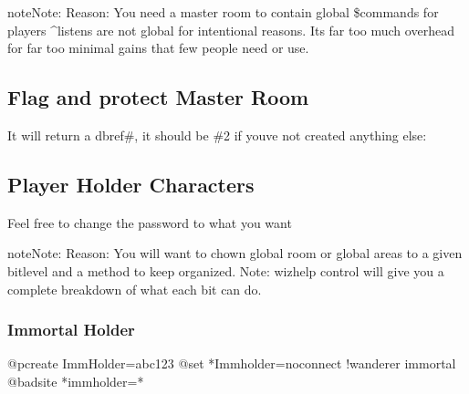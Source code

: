 \documentclass[letterpaper,10pt,english]{sphinxmanual}
\begin{document}
\begin{sphinxVerbatim}[commandchars=\\\{\}]
  
\end{sphinxVerbatim}

\begin{sphinxadmonition}{note}{Note:}
\sphinxAtStartPar
Reason: You need a master room to contain global \$commands for players
\textasciicircum{}listens are not global for intentional reasons.  It\textquotesingle{}s far too much overhead for far too minimal gains that few people need or use.
\end{sphinxadmonition}


\subsection{Flag and protect Master Room}
\label{\detokenize{gettingstarted:flag-and-protect-master-room}}
\sphinxAtStartPar
It will return a dbref\#, it should be \#2 if you\textquotesingle{}ve not created anything else:

\begin{sphinxVerbatim}[commandchars=\\\{\}]
 
\end{sphinxVerbatim}


\subsection{Player Holder Characters}
\label{\detokenize{gettingstarted:player-holder-characters}}
\sphinxAtStartPar
Feel free to change the password to what you want

\begin{sphinxadmonition}{note}{Note:}
\sphinxAtStartPar
Reason: You will want to chown global room or global areas to a given bitlevel and a method to keep organized.
Note: wizhelp control will give you a complete breakdown of what each bit can do.
\end{sphinxadmonition}


\subsubsection{Immortal Holder}
\label{\detokenize{gettingstarted:immortal-holder}}
\begin{sphinxVerbatim}[commandchars=\\\{\}]
@pcreate ImmHolder=abc123
@set *Immholder=no\PYGZus{}connect !wanderer immortal
@badsite *immholder=*
\end{sphinxVerbatim}
\end{document}

